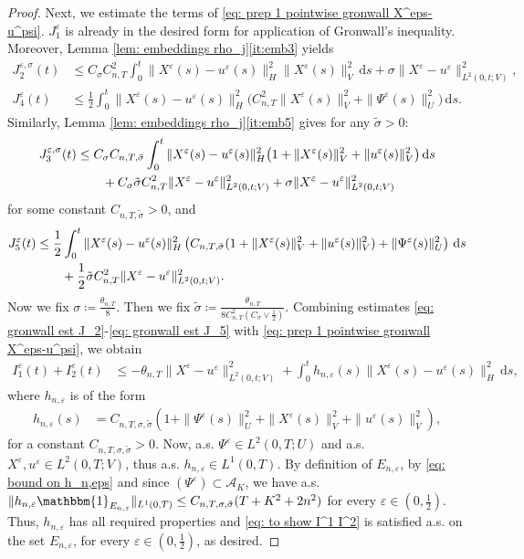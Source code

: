 \documentclass{amsart}
\newcommand{\dd}{\,\mathrm{d}}
\newcommand{\one}{\mathbbm{1}}
\newcommand{\<}{\langle}
\newcommand{\?}{\rangle}
\theoremstyle{plain}
\theoremstyle{remark}
\theoremstyle{plain}
\numberwithin{equation}{section}
\newcommand{\eps}{\varepsilon}
\begin{document}
\begin{proof}
Next, we estimate the terms of \eqref{eq: prep 1 pointwise gronwall X^eps-u^psi}.
    ${J}_1^\eps$ is already in the desired form for application of Gronwall's inequality. Moreover,
    Lemma \ref{lem: embeddings rho_j}\ref{it:emb3} yields
    \begin{align}
    J_2^{\eps,\sigma}(t)
    &\leq  C_\sigma C_{n,T}^2 \int_0^t\|X^\eps(s)-u^{\eps}(s)\|_H^2\|X^\eps(s)\|_V^2\dd s +\sigma \|X^\eps-u^{\eps}\|_{L^2(0,t;V)}^2, \label{eq: gronwall est J_2}\\
    J_4^\eps(t)&\leq  \frac{1}{2} \int_0^t\|X^\eps(s)-u^{\eps}(s)\|_H^2\big( C_{n,T}^2\|X^\eps(s)\|_V^2+\|\Psi^\eps(s)\|_U^2\big)\dd s.\label{eq: gronwall est J_4}
    \end{align}
    Similarly,
    Lemma \ref{lem: embeddings rho_j}\ref{it:emb5} gives for any $\tilde{\sigma}>0$:
    \begin{align}\label{eq: gronwall est J_3}
    J_3^{\eps,\sigma}(t)
    &\leq  C_\sigma C_{n,T,\tilde{\sigma}} \int_0^t\|X^\eps(s)-u^{\eps}(s)\|_H^2\big(1+\|X^\eps(s)\|_V^2+\|u^{\eps}(s)\|_V^2\big)\dd s \notag\\
    &\qquad+C_\sigma\tilde{\sigma}C_{n,T}^2\|X^\eps-u^{\eps}\|_{L^2(0,t;V)}^2+\sigma \|X^\eps-u^{\eps}\|_{L^2(0,t;V)}^2
    \end{align}
    for some constant $C_{n,T,\tilde{\sigma}}>0$,
    and
    \begin{align}\label{eq: gronwall est J_5}
    J_5^\eps(t)&\leq   \frac{1}{2}\int_0^t\|X^\eps(s)-u^{\eps}(s)\|_H^2\left(C_{n,T,\tilde{\sigma}}(1+\|X^\eps(s)\|_V^2+\|u^{\eps}(s)\|_V^2)+\|\Psi^\eps(s)\|_U^2\right)\dd s \notag\\
    &\qquad+\frac{1}{2}\tilde{\sigma}C_{n,T}^2\|X^\eps-u^{\eps}\|_{L^2(0,t;V)}^2.
    \end{align}
    Now we fix $\sigma\coloneqq \frac{\theta_{n,T}}{8}$. Then we fix $\tilde{\sigma}\coloneqq \frac{\theta_{n,T}}{8C_{n,T}^2(C_\sigma\vee\frac{1}{2})}$.
    Combining estimates \eqref{eq: gronwall est J_2}-\eqref{eq: gronwall est J_5} with \eqref{eq: prep 1 pointwise gronwall X^eps-u^psi}, we obtain
    \begin{align*}
     {I}_1^\eps(t)+{I}_2^\eps(t)&\leq -\theta_{n,T}\|X^\eps-u^{\eps}\|_{L^2(0,t;V)}^2+\int_0^t h_{n,\eps}(s)\|X^\eps(s)-u^{\eps}(s)\|_H^2\dd s,
    \end{align*}
    where $h_{n,\eps}$ is of the form
    \begin{align}
    h_{n,\eps}(s)&=
    C_{n,T,\sigma,\tilde{\sigma}}\left(1+\|\Psi^\eps(s)\|_U^2+\|X^\eps(s)\|_V^2+\|u^{\eps}(s)\|_V^2\right), \label{eq: bound on h_n,eps}
    \end{align}
    for a constant $C_{n,T,\sigma,\tilde{\sigma}}>0$. Now, a.s. \!$\Psi^\eps\in L^2(0,T;U)$ and a.s. \!$X^\eps,u^{\eps}\in L^2(0,T;V)$, thus a.s. \!$h_{n,\eps}\in L^1(0,T)$.  By definition of $E_{n,\eps}$, by \eqref{eq: bound on h_n,eps} and since $(\Psi^\eps)\subset \mathcal{A}_K$, we have a.s. \!$\|h_{n,\eps}\one_{E_{n,\eps}}\|_{L^1(0,T)}\leq C_{n,T,\sigma,\tilde{\sigma}}(T+K^2+2n^2)$ for every $\eps\in(0,\frac{1}{2})$. Thus, $h_{n,\eps}$ has all required properties and \eqref{eq: to show I^1 I^2} is satisfied a.s. \!on the set $E_{n,\eps}$, for every $\eps\in(0,\frac{1}{2})$, as desired.


\end{proof}
\end{document}
